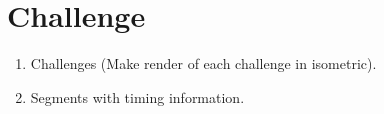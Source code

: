 \section{Challenge}
\begin{enumerate}
	\item Challenges (Make render of each challenge in isometric).
	\item Segments with timing information.
\end{enumerate}